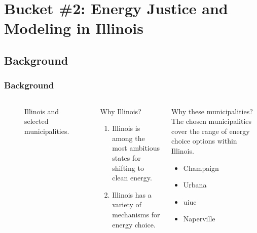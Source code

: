\section{Bucket \#2: Energy Justice and Modeling in Illinois}

\subsection{Background}


\begin{frame}
    \frametitle{Background}
        
    \begin{columns}
        \column[t]{2.5cm}
        \begin{figure}
            \centering
            \resizebox{\columnwidth}{!}{}
            \caption{Illinois and selected municipalities.}
            \label{fig:illinois}
        \end{figure}
        \column[t]{7.5cm}
        \begin{block}{Why Illinois?}
            \begin{enumerate}[<+->]
                \item Illinois is among the most ambitious states for shifting
                to clean energy.
                \item Illinois has a variety of mechanisms for energy choice.
            \end{enumerate}
        \end{block}
        \begin{block}{Why these municipalities?}
            The chosen municipalities cover the range of energy choice options
            within Illinois.
            \begin{itemize}[<+->]
                \item Champaign
                \item Urbana
                \item \gls{uiuc}
                \item Naperville
            \end{itemize}
        \end{block}
    \end{columns}
\end{frame}


